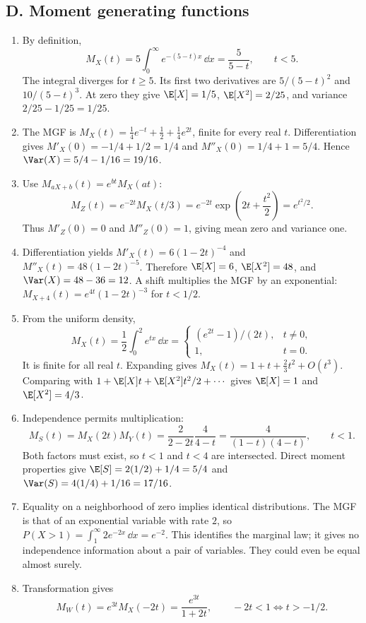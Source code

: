 \subsection{D. Moment generating functions}
\begin{enumerate}[label=\textbf{D\arabic*.},leftmargin=*,itemsep=1em]
\item By definition,
\[
M_X(t)=5\int_0^\infty e^{-(5-t)x}\,\dd x=\frac5{5-t},\qquad t<5.
\]
The integral diverges for $t\geq5$. Its first two derivatives are $5/(5-t)^2$ and $10/(5-t)^3$. At zero they give $\E[X]=1/5$, $\E[X^2]=2/25$, and variance $2/25-1/25=1/25$.
\item The MGF is $M_X(t)=\tfrac14e^{-t}+\tfrac12+\tfrac14e^{2t}$, finite for every real $t$. Differentiation gives $M'_X(0)=-1/4+1/2=1/4$ and $M''_X(0)=1/4+1=5/4$. Hence $\Var(X)=5/4-1/16=19/16$.
\item Use $M_{aX+b}(t)=e^{bt}M_X(at)$:
\[
M_Z(t)=e^{-2t}M_X(t/3)
=e^{-2t}\exp\left(2t+\frac{t^2}{2}\right)=e^{t^2/2}.
\]
Thus $M'_Z(0)=0$ and $M''_Z(0)=1$, giving mean zero and variance one.
\item Differentiation yields $M'_X(t)=6(1-2t)^{-4}$ and $M''_X(t)=48(1-2t)^{-5}$. Therefore $\E[X]=6$, $\E[X^2]=48$, and $\Var(X)=48-36=12$. A shift multiplies the MGF by an exponential: $M_{X+4}(t)=e^{4t}(1-2t)^{-3}$ for $t<1/2$.
\item From the uniform density,
\[
M_X(t)=\frac12\int_0^2e^{tx}\,\dd x=
\begin{cases}(e^{2t}-1)/(2t),&t\ne0,\\1,&t=0.\end{cases}
\]
It is finite for all real $t$. Expanding gives $M_X(t)=1+t+\tfrac23t^2+O(t^3)$. Comparing with $1+\E[X]t+\E[X^2]t^2/2+\cdots$ gives $\E[X]=1$ and $\E[X^2]=4/3$.
\item Independence permits multiplication:
\[
M_S(t)=M_X(2t)M_Y(t)=\frac2{2-2t}\frac4{4-t}
=\frac4{(1-t)(4-t)},\qquad t<1.
\]
Both factors must exist, so $t<1$ and $t<4$ are intersected. Direct moment properties give $\E[S]=2(1/2)+1/4=5/4$ and $\Var(S)=4(1/4)+1/16=17/16$.
\item Equality on a neighborhood of zero implies identical distributions. The MGF is that of an exponential variable with rate $2$, so $P(X>1)=\int_1^\infty2e^{-2x}\,\dd x=e^{-2}$. This identifies the marginal law; it gives no independence information about a pair of variables. They could even be equal almost surely.
\item Transformation gives
\[
M_W(t)=e^{3t}M_X(-2t)=\frac{e^{3t}}{1+2t},\qquad -2t<1\iff t>-1/2.
\]
\end{enumerate}
